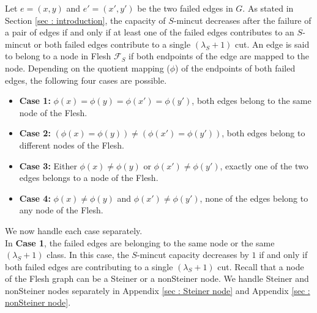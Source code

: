\documentclass[letterpaper,11pt]{article}
\begin{document}
Let $e=(x,y)$ and $e'=(x',y')$ be the two failed edges in $G$. As stated in Section \ref{sec : introduction}, the capacity of $S$-mincut decreases after the failure of a pair of edges if and only if at least one of the failed edges contributes to an $S$-mincut or both failed edges contribute to a single $(\lambda_S+1)$ cut. An edge is said to belong to a node in Flesh ${\mathcal F}_S$ if both endpoints of the edge are mapped to the node.
Depending on the quotient mapping ($\phi$) of the endpoints of both failed edges, the following four cases are possible.
\begin{itemize}
    \item \textbf{Case 1:} $\phi(x)=\phi(y)=\phi(x')=\phi(y')$, both edges belong to the same node of the Flesh. 
    \item \textbf{Case 2:} $(\phi(x)=\phi(y))\ne(\phi(x')=\phi(y'))$, both edges belong to different nodes of the Flesh.
    \item \textbf{Case 3:} Either $\phi(x)\ne \phi(y)$ or $\phi(x') \ne \phi(y')$, exactly one of the two edges belongs to a node of the Flesh.
    \item \textbf{Case 4:} $\phi(x) \ne \phi(y)$ and $\phi(x') \ne \phi(y')$, none of the edges belong to any node of the Flesh.
\end{itemize}
We now handle each case separately.\\

\noindent
In \textbf{Case 1}, the failed edges are belonging to the same node or the same $(\lambda_S+1)$ class. In this case, the $S$-mincut capacity decreases by $1$ if and only if both failed edges are contributing to a single $(\lambda_S+1)$ cut. Recall that a node of the Flesh graph can be a Steiner or a nonSteiner node. We handle Steiner and nonSteiner nodes separately in Appendix \ref{sec : Steiner node} and Appendix \ref{sec : nonSteiner node}.\\
\end{document}
